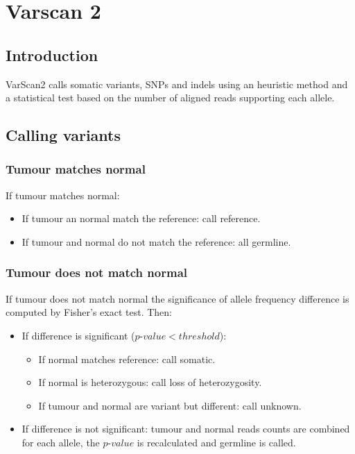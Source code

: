 \section{Varscan 2}

	\subsection{Introduction}
	VarScan2 calls somatic variants, SNPs and indels using an heuristic method and a statistical test based on the number of aligned reads supporting each allele.

	\subsection{Calling variants}

		\subsubsection{Tumour matches normal}
		If tumour matches normal:

		\begin{multicols}{2}
			\begin{itemize}
				\item If tumour an normal match the reference: call reference.
				\item If tumour and normal do not match the reference: all germline.
			\end{itemize}
		\end{multicols}

		\subsubsection{Tumour does not match normal}
		If tumour does not match normal the significance of allele frequency difference is computed by Fisher's exact test.
		Then:

		\begin{multicols}{2}
			\begin{itemize}
				\item If difference is significant ($p$-$value < threshold$):

					\begin{itemize}
						\item If normal matches reference: call somatic.
						\item If normal is heterozygous: call loss of heterozygosity.
						\item If tumour and normal are variant but different: call unknown.
					\end{itemize}

				\item If difference is not significant: tumour and normal reads counts are combined for each allele, the $p$-$value$ is recalculated and germline is called.
			\end{itemize}
		\end{multicols}

